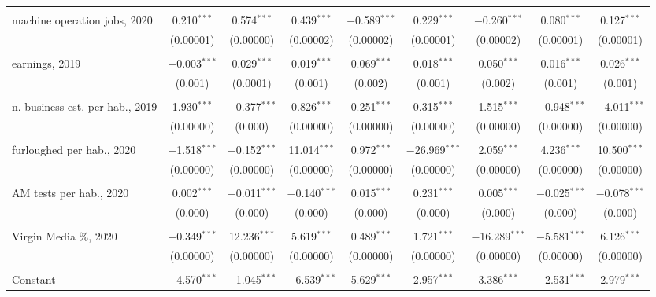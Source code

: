 \documentclass[]{interact}
\theoremstyle{plain}%
\theoremstyle{definition}
\theoremstyle{remark}
\begin{document}
\begin{table}
\begin{tabular}{@{\extracolsep{5pt}}lcccccccc}
  & & & & & & & & \\ 
 machine operation jobs, 2020 & 0.210$^{***}$ & 0.574$^{***}$ & 0.439$^{***}$ & $-$0.589$^{***}$ & 0.229$^{***}$ & $-$0.260$^{***}$ & 0.080$^{***}$ & 0.127$^{***}$ \\ 
  & (0.00001) & (0.00000) & (0.00002) & (0.00002) & (0.00001) & (0.00002) & (0.00001) & (0.00001) \\ 
  & & & & & & & & \\ 
 earnings, 2019 & $-$0.003$^{***}$ & 0.029$^{***}$ & 0.019$^{***}$ & 0.069$^{***}$ & 0.018$^{***}$ & 0.050$^{***}$ & 0.016$^{***}$ & 0.026$^{***}$ \\ 
  & (0.001) & (0.0001) & (0.001) & (0.002) & (0.001) & (0.002) & (0.001) & (0.001) \\ 
  & & & & & & & & \\ 
 n. business est. per hab., 2019 & 1.930$^{***}$ & $-$0.377$^{***}$ & 0.826$^{***}$ & 0.251$^{***}$ & 0.315$^{***}$ & 1.515$^{***}$ & $-$0.948$^{***}$ & $-$4.011$^{***}$ \\ 
  & (0.00000) & (0.000) & (0.00000) & (0.00000) & (0.00000) & (0.00000) & (0.00000) & (0.00000) \\ 
  & & & & & & & & \\ 
 furloughed per hab., 2020 & $-$1.518$^{***}$ & $-$0.152$^{***}$ & 11.014$^{***}$ & 0.972$^{***}$ & $-$26.969$^{***}$ & 2.059$^{***}$ & 4.236$^{***}$ & 10.500$^{***}$ \\ 
  & (0.00000) & (0.00000) & (0.00000) & (0.00000) & (0.00000) & (0.00000) & (0.00000) & (0.00000) \\ 
  & & & & & & & & \\ 
 AM tests per hab., 2020 & 0.002$^{***}$ & $-$0.011$^{***}$ & $-$0.140$^{***}$ & 0.015$^{***}$ & 0.231$^{***}$ & 0.005$^{***}$ & $-$0.025$^{***}$ & $-$0.078$^{***}$ \\ 
  & (0.000) & (0.000) & (0.000) & (0.000) & (0.000) & (0.000) & (0.000) & (0.000) \\ 
  & & & & & & & & \\ 
 Virgin Media \%, 2020 & $-$0.349$^{***}$ & 12.236$^{***}$ & 5.619$^{***}$ & 0.489$^{***}$ & 1.721$^{***}$ & $-$16.289$^{***}$ & $-$5.581$^{***}$ & 6.126$^{***}$ \\ 
  & (0.00000) & (0.00000) & (0.00000) & (0.00000) & (0.00000) & (0.00000) & (0.00000) & (0.00000) \\ 
  & & & & & & & & \\ 
 Constant & $-$4.570$^{***}$ & $-$1.045$^{***}$ & $-$6.539$^{***}$ & 5.629$^{***}$ & 2.957$^{***}$ & 3.386$^{***}$ & $-$2.531$^{***}$ & 2.979$^{***}$ \\ 

\end{tabular}
\end{table}
\end{document}
